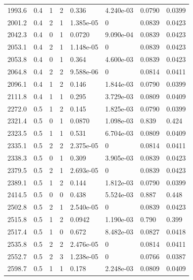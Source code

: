 \documentclass[preview]{standalone}
\begin{document}
{{{\begin{tabular}{L{1.2cm}C{1.2cm} C{0.3cm}C{0.5cm} C{1.4cm}C{1.4cm} C{1.4cm}C{1.4cm}}
  1993.6  &   0.4  & 1     &  2 &  0.336  & 4.240e-03  & 0.0790 &  0.0399   \\ 
  2001.2  &   0.4  & 2     &  1 &  1.385e-05  & 0  & 0.0839 &  0.0423   \\ 
  2042.3  &   0.4  & 0     &  1 &  0.0720  & 9.090e-04  & 0.0839 &  0.0423   \\ 
  2053.1  &   0.4  & 2     &  1 &  1.148e-05  & 0  & 0.0839 &  0.0423   \\ 
  2053.8  &   0.4  & 0     &  1 &  0.364  & 4.600e-03  & 0.0839 &  0.0423   \\ 
  2064.8  &   0.4  & 2     &  2 &  9.588e-06  & 0  & 0.0814 &  0.0411   \\ 
  2096.1  &   0.4  & 1     &  2 &  0.146  & 1.844e-03  & 0.0790 &  0.0399   \\ 
  2111.8  &   0.4  & 1     &  1 &  0.295  & 3.729e-03  & 0.0809 &  0.0409   \\ 
  2272.0  &   0.5  & 1     &  2 &  0.145  & 1.825e-03  & 0.0790 &  0.0399   \\ 
  2321.4  &   0.5  & 0     &  1 &  0.0870  & 1.098e-03  & 0.839 &  0.424   \\ 
  2323.5  &   0.5  & 1     &  1 &  0.531  & 6.704e-03  & 0.0809 &  0.0409   \\ 
  2335.1  &   0.5  & 2     &  2 &  2.375e-05  & 0  & 0.0814 &  0.0411   \\ 
  2338.3  &   0.5  & 0     &  1 &  0.309  & 3.905e-03  & 0.0839 &  0.0423   \\ 
  2379.5  &   0.5  & 2     &  1 &  2.693e-05  & 0  & 0.0839 &  0.0423   \\ 
  2389.1  &   0.5  & 1     &  2 &  0.144  & 1.812e-03  & 0.0790 &  0.0399   \\ 
  2414.5  &   0.5  & 0     &  0 &  0.438  & 5.524e-03  & 0.887 &  0.448   \\ 
  2502.8  &   0.5  & 2     &  1 &  2.540e-05  & 0  & 0.0839 &  0.0423   \\ 
  2515.8  &   0.5  & 1     &  2 &  0.0942  & 1.190e-03  & 0.790 &  0.399   \\ 
  2517.4  &   0.5  & 1     &  0 &  0.672  & 8.482e-03  & 0.0827 &  0.0418   \\ 
  2535.8  &   0.5  & 2     &  2 &  2.476e-05  & 0  & 0.0814 &  0.0411   \\ 
  2552.7  &   0.5  & 2     &  3 &  1.238e-05  & 0  & 0.0766 &  0.0387   \\ 
  2598.7  &   0.5  & 1     &  1 &  0.178  & 2.248e-03  & 0.0809 &  0.0409   \\ 

\end{tabular}}}}
\end{document}
